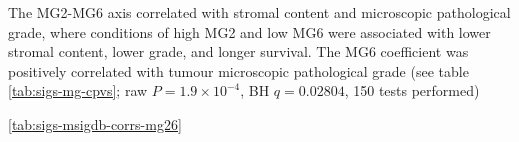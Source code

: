 \documentclass[dissertation.tex]{subfiles}
\begin{document}
\begin{table}[ht]
\begin{tabularx}{\textwidth}{ @{} X l l @{} }
   \bottomrule
\end{tabularx}
\end{table}

The MG2-MG6 axis correlated with stromal content and microscopic pathological grade, where conditions of high MG2 and low MG6 were associated with lower stromal content, lower grade, and longer survival.  The MG6 coefficient was positively correlated with tumour microscopic pathological grade (see table \ref{tab:sigs-mg-cpvs}; raw $P = 1.9 \times 10^{-4}$, \gls{BH} $q = 0.02804$, 150 tests performed)

\ref{tab:sigs-msigdb-corrs-mg26}
\end{document}
